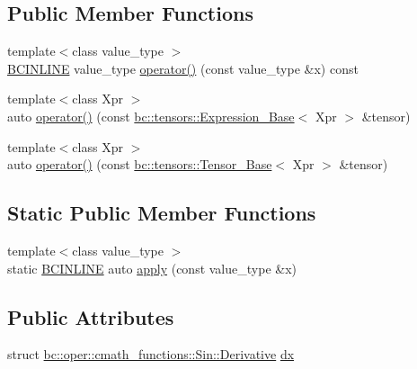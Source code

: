 \subsection*{Public Member Functions}
\begin{DoxyCompactItemize}
\item 
{\footnotesize template$<$class value\+\_\+type $>$ }\\\hyperlink{common_8h_a6699e8b0449da5c0fafb878e59c1d4b1}{B\+C\+I\+N\+L\+I\+NE} value\+\_\+type \hyperlink{structbc_1_1oper_1_1cmath__functions_1_1Sin_a1e130441b55a6ac62f462f8a5d398fe3}{operator()} (const value\+\_\+type \&x) const
\item 
{\footnotesize template$<$class Xpr $>$ }\\auto \hyperlink{structbc_1_1oper_1_1cmath__functions_1_1Sin_acfc4f7388c0b3709c8d8bffa82b79921}{operator()} (const \hyperlink{classbc_1_1tensors_1_1Expression__Base}{bc\+::tensors\+::\+Expression\+\_\+\+Base}$<$ Xpr $>$ \&tensor)
\item 
{\footnotesize template$<$class Xpr $>$ }\\auto \hyperlink{structbc_1_1oper_1_1cmath__functions_1_1Sin_ad10a5102345942d4a32cf4449b072082}{operator()} (const \hyperlink{classbc_1_1tensors_1_1Tensor__Base}{bc\+::tensors\+::\+Tensor\+\_\+\+Base}$<$ Xpr $>$ \&tensor)
\end{DoxyCompactItemize}
\subsection*{Static Public Member Functions}
\begin{DoxyCompactItemize}
\item 
{\footnotesize template$<$class value\+\_\+type $>$ }\\static \hyperlink{common_8h_a6699e8b0449da5c0fafb878e59c1d4b1}{B\+C\+I\+N\+L\+I\+NE} auto \hyperlink{structbc_1_1oper_1_1cmath__functions_1_1Sin_aead092daf7e5849aa2a3e001080c867e}{apply} (const value\+\_\+type \&x)
\end{DoxyCompactItemize}
\subsection*{Public Attributes}
\begin{DoxyCompactItemize}
\item 
struct \hyperlink{structbc_1_1oper_1_1cmath__functions_1_1Sin_1_1Derivative}{bc\+::oper\+::cmath\+\_\+functions\+::\+Sin\+::\+Derivative} \hyperlink{structbc_1_1oper_1_1cmath__functions_1_1Sin_a8d1410855a514f504e227be2507d7905}{dx}
\end{DoxyCompactItemize}


